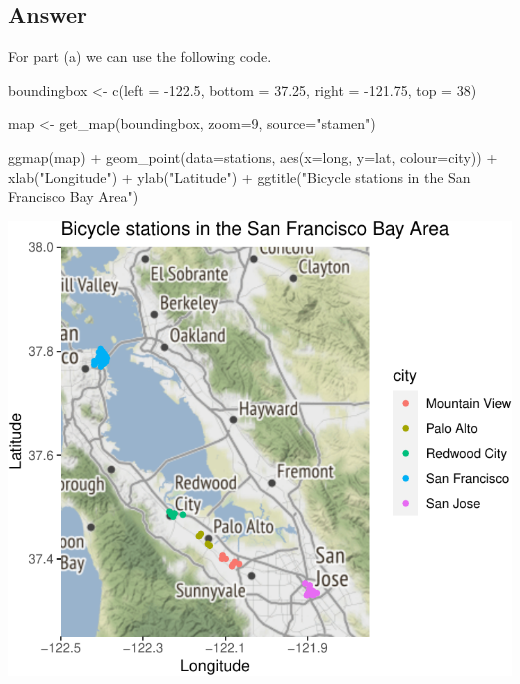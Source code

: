 \documentclass[
]{book}
\newenvironment{Shaded}{\begin{snugshade}}{\end{snugshade}}
\newcommand{\AttributeTok}[1]{\textcolor[rgb]{0.77,0.63,0.00}{#1}}
\newcommand{\DecValTok}[1]{\textcolor[rgb]{0.00,0.00,0.81}{#1}}
\newcommand{\FloatTok}[1]{\textcolor[rgb]{0.00,0.00,0.81}{#1}}
\newcommand{\FunctionTok}[1]{\textcolor[rgb]{0.00,0.00,0.00}{#1}}
\newcommand{\NormalTok}[1]{#1}
\newcommand{\OtherTok}[1]{\textcolor[rgb]{0.56,0.35,0.01}{#1}}
\newcommand{\SpecialCharTok}[1]{\textcolor[rgb]{0.00,0.00,0.00}{#1}}
\newcommand{\StringTok}[1]{\textcolor[rgb]{0.31,0.60,0.02}{#1}}
\begin{document}
\hypertarget{answer-7}{%
\subsection{Answer}\label{answer-7}}

For part (a) we can use the following code.

\begin{Shaded}
\begin{Highlighting}[]
\NormalTok{boundingbox }\OtherTok{\textless{}{-}} \FunctionTok{c}\NormalTok{(}\AttributeTok{left =} \SpecialCharTok{{-}}\FloatTok{122.5}\NormalTok{, }\AttributeTok{bottom =} \FloatTok{37.25}\NormalTok{, }\AttributeTok{right =} \SpecialCharTok{{-}}\FloatTok{121.75}\NormalTok{, }\AttributeTok{top =} \DecValTok{38}\NormalTok{)}

\NormalTok{map }\OtherTok{\textless{}{-}} \FunctionTok{get\_map}\NormalTok{(boundingbox, }\AttributeTok{zoom=}\DecValTok{9}\NormalTok{, }\AttributeTok{source=}\StringTok{"stamen"}\NormalTok{)}

\FunctionTok{ggmap}\NormalTok{(map) }\SpecialCharTok{+} 
    \FunctionTok{geom\_point}\NormalTok{(}\AttributeTok{data=}\NormalTok{stations, }\FunctionTok{aes}\NormalTok{(}\AttributeTok{x=}\NormalTok{long, }\AttributeTok{y=}\NormalTok{lat,  }\AttributeTok{colour=}\NormalTok{city)) }\SpecialCharTok{+}
    \FunctionTok{xlab}\NormalTok{(}\StringTok{"Longitude"}\NormalTok{) }\SpecialCharTok{+} \FunctionTok{ylab}\NormalTok{(}\StringTok{"Latitude"}\NormalTok{) }\SpecialCharTok{+} 
    \FunctionTok{ggtitle}\NormalTok{(}\StringTok{"Bicycle stations in the San Francisco Bay Area"}\NormalTok{)}
\end{Highlighting}
\end{Shaded}

\includegraphics{bookdown-demo_files/figure-latex/unnamed-chunk-89-1.pdf}
\end{document}
